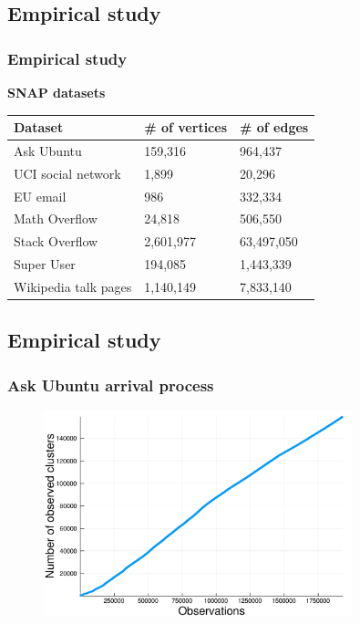 \documentclass[final,hyperref={pdfpagelabels=false},noamsthm]{beamer}
\begin{document}
\subsection{Empirical study}
\begin{frame}
	\frametitle{Empirical study}
	\textbf{SNAP datasets} \cite{snapnets}
	\begin{table}[b]
		\label{tab:datasets}
		\begin{center}
			\begin{tabular}{lll}
				Dataset                 & \# of vertices   & \# of edges    \\
				\hline
				Ask Ubuntu    & 159,316   & 964,437    \\
				UCI social network   & 1,899     & 20,296     \\
				EU email        & 986       & 332,334    \\
				Math Overflow & 24,818    & 506,550    \\
				Stack Overflow           & 2,601,977 & 63,497,050 \\
				Super User    & 194,085   & 1,443,339  \\
				Wikipedia talk pages    & 1,140,149 & 7,833,140 \\
			\end{tabular}
		\end{center}
	\end{table}
	
\end{frame}

\subsection{Empirical study}
\begin{frame}
	\frametitle{Ask Ubuntu arrival process}
	\begin{figure}[h]
		\includegraphics[width=0.8\textwidth]{fig/arrival_times_askubuntu.pdf}
	\end{figure}
	
\end{frame}
\end{document}
